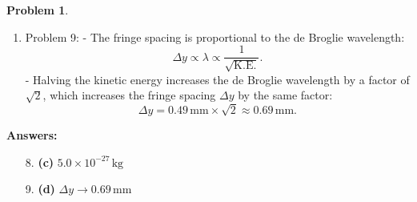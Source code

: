 \documentclass[12pt]{article}
\theoremstyle{definition} %
\newtheorem{problem}{Problem}
\theoremstyle{plain} %
\begin{document}
\begin{problem}
\begin{enumerate}
    \item Problem 9:
    - The fringe spacing is proportional to the de Broglie wavelength:
    $$
    \Delta y \propto \lambda \propto \frac{1}{\sqrt{\text{K.E.}}}.
    $$
    - Halving the kinetic energy increases the de Broglie wavelength by a factor of \(\sqrt{2}\), which increases the fringe spacing \(\Delta y\) by the same factor:
    $$
    \Delta y = 0.49 \, \text{mm} \times \sqrt{2} \approx 0.69 \, \text{mm}.
    $$
\end{enumerate}

\textbf{Answers:}
\begin{enumerate}
    \item[8.] \textbf{(c)} \(5.0 \times 10^{-27} \, \text{kg}\)
    \item[9.] \textbf{(d)} \(\Delta y \to 0.69 \, \text{mm}\)
\end{enumerate}

\end{problem}
\end{document}
